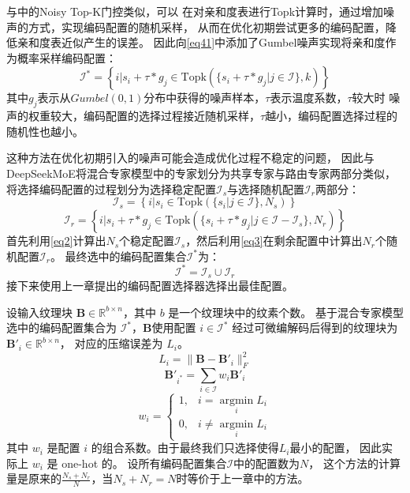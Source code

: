与中的Noisy Top-K门控类似，可以
在对亲和度表进行Topk计算时，通过增加噪声的方式，实现编码配置的随机采样，
从而在优化初期尝试更多的编码配置，降低亲和度表近似产生的误差。
因此向\eqref{eq41}中添加了Gumbel噪声\cite{jang2016categorical}实现将亲和度作为概率采样编码配置：
\begin{equation}
\mathcal{I}^*=\left\{i|s_i+\tau*g_j\in\text{Topk}(\{s_i+\tau*g_j|j\in\mathcal{I}\},k)\right\}
\end{equation}
其中$g_j$表示从$Gumbel(0,1)$分布中获得的噪声样本，$\tau$表示温度系数，$\tau$较大时
噪声的权重较大，编码配置的选择过程接近随机采样，$\tau$越小，编码配置选择过程的随机性也越小。

这种方法在优化初期引入的噪声可能会造成优化过程不稳定的问题，
因此与DeepSeekMoE\cite{dai2024deepseekmoe}将混合专家模型中的专家划分为共享专家与路由专家两部分类似，
将选择编码配置的过程划分为选择稳定配置$\mathcal{I}_s$与选择随机配置$\mathcal{I}_r$两部分：
\begin{equation}
\label{eq2}
    \mathcal{I}_s=\left\{i|s_i\in\text{Topk}(\{s_i|j\in\mathcal{I}\},N_s)\right\}
\end{equation}
\begin{equation}
\label{eq3}
\mathcal{I}_r=\left\{i|s_i+\tau*g_j\in\text{Topk}(\{s_i+\tau*g_j|j\in\mathcal{I}-\mathcal{I}_s\},N_r)\right\}
\end{equation}
首先利用\eqref{eq2}计算出$N_s$个稳定配置$\mathcal{I}_s$，然后利用\eqref{eq3}在剩余配置中计算出$N_r$个随机配置$\mathcal{I}_r$。
最终选中的编码配置集合$\mathcal{I}^*$为：
\begin{equation}
\mathcal{I}^*=\mathcal{I}_{s}\cup\mathcal{I}_r
\end{equation}
接下来使用上一章提出的编码配置选择器选择出最佳配置。

设输入纹理块 $\mathbf{B}\in\mathbb{R}^{b\times n}$，其中 $b$ 是一个纹理块中的纹素个数。
基于混合专家模型选中的编码配置集合为 $\mathcal{I}^*$，$\mathbf{B}$使用配置 $i\in\mathcal{I}^*$ 
经过可微编解码后得到的纹理块为 $\mathbf{B}'_i\in\mathbb{R}^{b\times n}$，
对应的压缩误差为 $L_i$。
\begin{equation}
L_i=\|\mathbf{B}-\mathbf{B}'_i\|_F^2
\end{equation}
\begin{equation}
\mathbf{B}'_{i^*}=\sum_{i\in\mathcal{I}} w_i\mathbf{B}'_i
\end{equation}
\begin{equation}
    w_i =\left\{\begin{matrix}
        1,& i=\mathop{\arg\min}\limits_{i} L_i
        \\0,& i\ne\mathop{\arg\min}\limits_{i} L_i
        \end{matrix}\right.
\end{equation}
其中 $w_i$ 是配置 $i$ 的组合系数。由于最终我们只选择使得$L_i$最小的配置，
因此实际上 $w_i$ 是 one-hot 的。
设所有编码配置集合$\mathcal{I}$中的配置数为$N$，
这个方法的计算量是原来的$\frac{N_s+N_r}{N}$，当$N_s+N_r=N$时等价于上一章中的方法。

